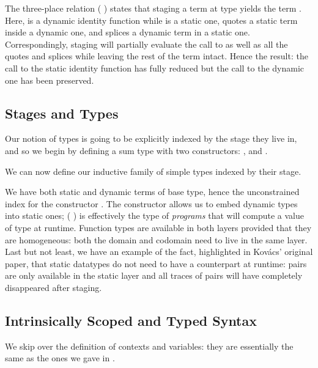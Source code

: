 \documentclass{article}
\begin{document}

The three-place relation (    ) states
that staging a term  at type  yields the term .
%
Here,  is a dynamic identity function
while  is a static one,
 quotes a static term inside a dynamic one,
and  splices a dynamic term in a static one.
%
Correspondingly, staging will partially evaluate the call to
 as well as all the quotes and splices while leaving
the rest of the term intact.
%
Hence the result: the call to the static identity function has
fully reduced but the call to the dynamic one has been preserved.


\subsection{Stages and Types}

Our notion of types is going to be explicitly indexed by the
stage they live in, and so we begin by defining a sum
type  with two constructors: ,
and .


We can now define our inductive family of simple types indexed
by their stage.


We have both static and dynamic terms of base type,
hence the unconstrained index  for the
constructor .
%
The constructor  allows us to embed dynamic
types into static ones; ( ) is effectively
the type of \emph{programs} that will compute a value of
type  at runtime.
%
Function types are available in both layers provided that
they are homogeneous: both the domain and codomain need
to live in the same layer.
%
Last but not least, we have an example of the fact,
highlighted in Kov{\'{a}}cs' original paper, that static
datatypes do not need to have a counterpart at runtime:
pairs are only available in the static layer and all traces
of pairs will have completely disappeared after staging.

\subsection{Intrinsically Scoped and Typed Syntax}

We skip over the definition of contexts and variables: they
are essentially the same as the ones we gave in .
\end{document}
